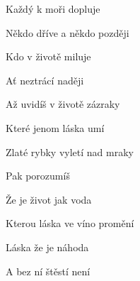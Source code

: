 \begin{song}
\bigskip

Každý k moři dopluje \par
{}Někdo dříve a někdo později \par
{}Kdo v životě miluje \par
Ať neztrácí naději  \par

\bigskip

Až uvidíš v životě zázraky \par
{}Které jenom láska umí \par
{}Zlaté rybky vyletí nad mraky \par
{}Pak porozumíš  \par

\bigskip

Že je život jak voda \par
{}Kterou láska ve víno promění \par
{}Láska že je náhoda \par
A bez ní štěstí není \par

\end{song}
    